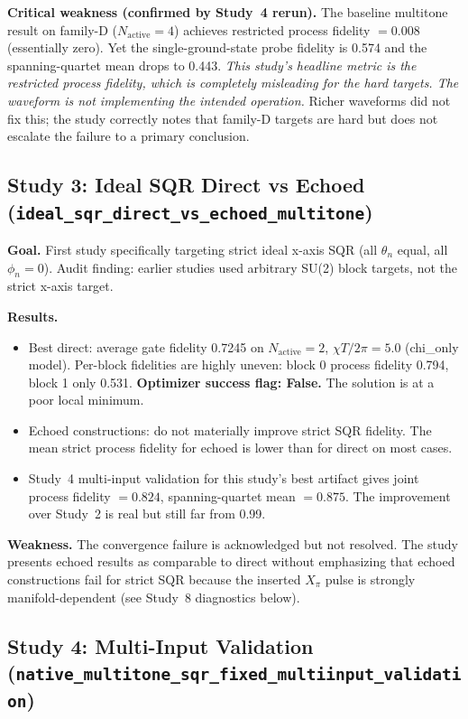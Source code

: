 \documentclass[11pt,letterpaper]{article}
\newcommand{\chiT}{\chi T / 2\pi}
\newcommand{\nact}{N_{\text{active}}}
\begin{document}
\textbf{Critical weakness (confirmed by Study~4 rerun).}
The baseline multitone result on family-D ($\nact = 4$) achieves
restricted process fidelity $= 0.008$ (essentially zero).
Yet the single-ground-state probe fidelity is 0.574 and the spanning-quartet mean
drops to 0.443.
\emph{This study's headline metric is the restricted process fidelity, which is
completely misleading for the hard targets.  The waveform is not implementing
the intended operation.}  Richer waveforms did not fix this; the study
correctly notes that family-D targets are hard but does not escalate the failure
to a primary conclusion.

\subsection{Study 3: Ideal SQR Direct vs Echoed (\texttt{ideal\_sqr\_direct\_vs\_echoed\_multitone})}

\textbf{Goal.}  First study specifically targeting strict ideal x-axis SQR
(all $\theta_n$ equal, all $\phi_n = 0$).  Audit finding: earlier studies used
arbitrary SU(2) block targets, not the strict x-axis target.

\textbf{Results.}
\begin{itemize}
\item Best direct: average gate fidelity 0.7245 on $\nact = 2$, $\chiT = 5.0$
  (chi\_only model).  Per-block fidelities are highly uneven:
  block 0 process fidelity 0.794, block 1 only 0.531.
  \textbf{Optimizer success flag: False.}  The solution is at a poor local minimum.
\item Echoed constructions: do not materially improve strict SQR fidelity.
  The mean strict process fidelity for echoed is lower than for direct on most cases.
\item Study~4 multi-input validation for this study's best artifact
  gives joint process fidelity $= 0.824$, spanning-quartet mean $= 0.875$.
  The improvement over Study~2 is real but still far from 0.99.
\end{itemize}

\textbf{Weakness.}  The convergence failure is acknowledged but not resolved.
The study presents echoed results as comparable to direct without emphasizing that
echoed constructions fail for strict SQR because the inserted $X_\pi$ pulse
is strongly manifold-dependent (see Study~8 diagnostics below).

\subsection{Study 4: Multi-Input Validation (\texttt{native\_multitone\_sqr\_fixed\_multiinput\_validation})}
\end{document}
